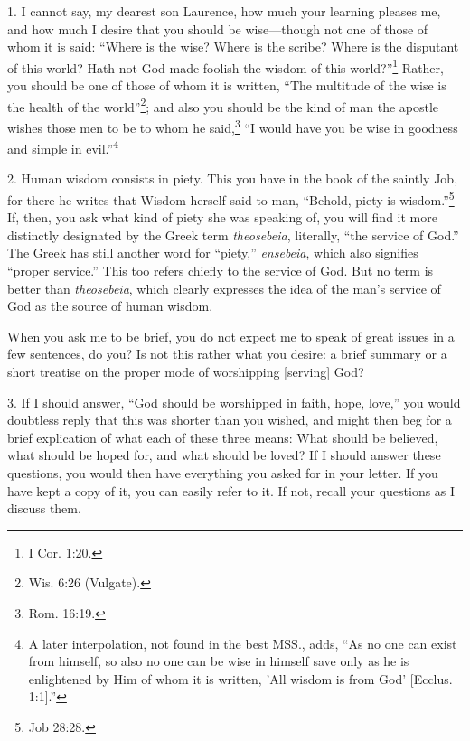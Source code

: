 
1. I cannot say, my dearest son Laurence, how much your learning pleases me, and how much I desire that you should be wise—though not one of those of whom it is said: ``Where is the wise? Where is the scribe? Where is the disputant of this world? Hath not God made foolish the wisdom of this world?''\footnote{I Cor. 1:20.} Rather, you should be one of those of whom it is written, ``The multitude of the wise is the health of the world''\footnote{Wis. 6:26 (Vulgate).}; and also you should be the kind of man the apostle wishes those men to be to whom he said,\footnote{Rom. 16:19.} ``I would have you be wise in goodness and simple in evil.''\footnote{A later interpolation, not found in the best MSS., adds, ``As no one can exist from himself, so also no one can be wise in himself save only as he is enlightened by Him of whom it is written, 'All wisdom is from God' [Ecclus. 1:1].''}

2. Human wisdom consists in piety. This you have in the book of the saintly Job, for there he writes that Wisdom herself said to man, ``Behold, piety is wisdom.''\footnote{Job 28:28.} If, then, you ask what kind of piety she was speaking of, you will find it more distinctly designated by the Greek term \emph{theosebeia}, literally, ``the service of God.'' The Greek has still another word for ``piety,'' \emph{ensebeia}, which also signifies ``proper service.'' This too refers chiefly to the service of God. But no term is better than \emph{theosebeia}, which clearly expresses the idea of the man's service of God as the source of human wisdom.

When you ask me to be brief, you do not expect me to speak of great issues in a few sentences, do you? Is not this rather what you desire: a brief summary or a short treatise on the proper mode of worshipping [serving] God?

3. If I should answer, ``God should be worshipped in faith, hope, love,'' you would doubtless reply that this was shorter than you wished, and might then beg for a brief explication of what each of these three means: What should be believed, what should be hoped for, and what should be loved? If I should answer these questions, you would then have everything you asked for in your letter. If you have kept a copy of it, you can easily refer to it. If not, recall your questions as I discuss them.

